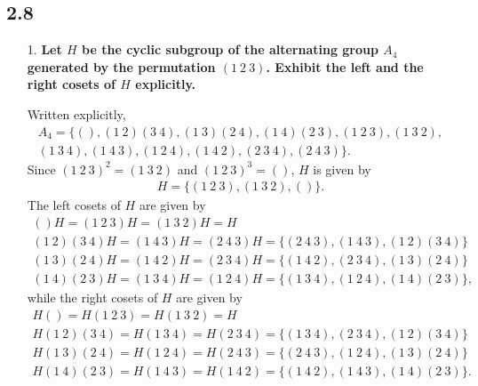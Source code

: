 \documentclass[a4paper,12pt]{article}
\begin{document}
\subsection*{2.8}
\begin{enumerate}
    \item[1.]
        \boldmath
        \textbf{Let $H$ be the cyclic subgroup of the alternating group $A_4$ generated by the permutation $(1\ 2\ 3)$. Exhibit the left and the right cosets of $H$ explicitly.} \par
        \unboldmath
        Written explicitly,
        \begin{align*}
            A_4 = \{ (), (1\ 2)(3\ 4), (1\ 3)(2\ 4), (1\ 4)(2\ 3), (1\ 2\ 3), (1\ 3\ 2), \\
            (1\ 3\ 4), (1\ 4\ 3), (1\ 2\ 4), (1\ 4\ 2), (2\ 3\ 4), (2\ 4\ 3) \}.
        \end{align*}
        Since $(1\ 2\ 3)^2 = (1\ 3\ 2)$ and $(1\ 2\ 3)^3 = ()$, $H$ is given by
        \begin{align*}
            H = \{ (1\ 2\ 3), (1\ 3\ 2), () \}.
        \end{align*}
        The left cosets of $H$ are given by
        \begin{gather*}
            ()H = (1\ 2\ 3)H = (1\ 3\ 2)H = H \\
            (1\ 2)(3\ 4)H = (1\ 4\ 3)H = (2\ 4\ 3)H = \{ (2\ 4\ 3), (1\ 4\ 3), (1\ 2)(3\ 4) \} \\
            (1\ 3)(2\ 4)H = (1\ 4\ 2)H = (2\ 3\ 4)H = \{ (1\ 4\ 2), (2\ 3\ 4), (1\ 3)(2\ 4) \} \\
            (1\ 4)(2\ 3)H = (1\ 3\ 4)H = (1\ 2\ 4)H = \{ (1\ 3\ 4), (1\ 2\ 4), (1\ 4)(2\ 3) \},
        \end{gather*}
        while the right cosets of $H$ are given by
        \begin{gather*}
            H() = H(1\ 2\ 3) = H(1\ 3\ 2) = H \\
            H(1\ 2)(3\ 4) = H(1\ 3\ 4) = H(2\ 3\ 4) = \{ (1\ 3\ 4), (2\ 3\ 4), (1\ 2)(3\ 4) \} \\
            H(1\ 3)(2\ 4) = H(1\ 2\ 4) = H(2\ 4\ 3) = \{ (2\ 4\ 3), (1\ 2\ 4), (1\ 3)(2\ 4) \} \\
            H(1\ 4)(2\ 3) = H(1\ 4\ 3) = H(1\ 4\ 2) = \{ (1\ 4\ 2), (1\ 4\ 3), (1\ 4)(2\ 3) \}.
        \end{gather*}


\end{enumerate}
\end{document}
